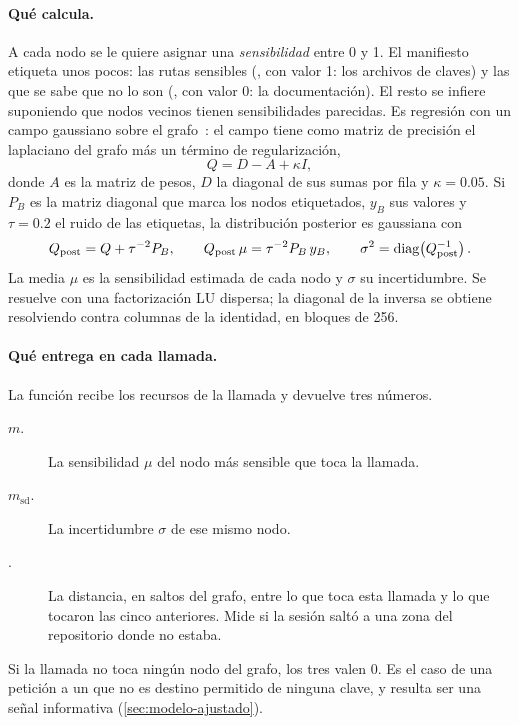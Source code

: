 \paragraph{Qué calcula.} A cada nodo se le quiere asignar una \emph{sensibilidad} entre 0 y 1. El
manifiesto etiqueta unos pocos: las rutas sensibles (, con valor 1: los archivos de
claves) y las que se sabe que no lo son (, con valor 0: la documentación). El resto
se infiere suponiendo que nodos vecinos tienen sensibilidades parecidas. Es regresión con un campo
gaussiano sobre el grafo~\cite{zhu}: el campo tiene como matriz de precisión el laplaciano del grafo
más un término de regularización,
\begin{equation}
  Q = D - A + \kappa I ,
  \label{eq:Q}
\end{equation}
donde $A$ es la matriz de pesos, $D$ la diagonal de sus sumas por fila y $\kappa = \num{0.05}$. Si $P_B$
es la matriz diagonal que marca los nodos etiquetados, $y_B$ sus valores y $\tau = \num{0.2}$ el ruido de
las etiquetas, la distribución posterior es gaussiana con
\begin{equation}
  Q_{\mathrm{post}} = Q + \tau^{-2} P_B , \qquad
  Q_{\mathrm{post}}\, \mu = \tau^{-2} P_B\, y_B , \qquad
  \sigma^2 = \operatorname{diag}\!\left(Q_{\mathrm{post}}^{-1}\right) .
  \label{eq:post}
\end{equation}
La media $\mu$ es la sensibilidad estimada de cada nodo y $\sigma$ su incertidumbre. Se resuelve con
una factorización LU dispersa; la diagonal de la inversa se obtiene resolviendo contra columnas de la
identidad, en bloques de 256.

\paragraph{Qué entrega en cada llamada.} La función  recibe los recursos de la llamada y
devuelve tres números.
\begin{description}
  \item[$m$.] La sensibilidad $\mu$ del nodo más sensible que toca la llamada.
  \item[$m_{\mathrm{sd}}$.] La incertidumbre $\sigma$ de ese mismo nodo.
  \item[.] La distancia, en saltos del grafo, entre lo que toca esta llamada y lo que
    tocaron las cinco anteriores. Mide si la sesión saltó a una zona del repositorio donde no estaba.
\end{description}
Si la llamada no toca ningún nodo del grafo, los tres valen 0. Es el caso de una petición a un
 que no es destino permitido de ninguna clave, y resulta ser una señal informativa
(\cref{sec:modelo-ajustado}).

